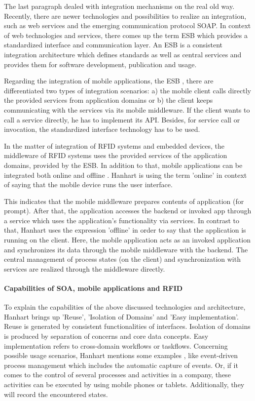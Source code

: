 The last paragraph dealed with integration mechanisms on the real old way. Recently, there are newer technologies and possibilities to realize an integration, such as web services and the emerging communication protocol \ac{SOAP}. In context of web technologies and services, there comes up the term \ac{ESB} \cite[p.141 ff.]{mobile} which provides a standardized interface and communication layer. An ESB is a consistent integration architecture which defines standards as well as central services and provides them for software development, publication and usage. 

Regarding the integration of mobile applications, the ESB \cite[p.143]{mobile}, there are differentiated two types of integration scenarios: a) the mobile client calls directly the provided services from application domains or b) the client keeps communicating with the services via its mobile middleware. If the client wants to call a service directly, he has to implement its \ac{API}. Besides, for service call or invocation, the standardized interface technology has to be used.

In the matter of integration of RFID systems and embedded devices, the middleware of RFID systems uses the provided services of the application domains, provided by the ESB. In addition to that, mobile applications can be integrated both online and offline \cite[p.146 ff.]{mobile}. Hanhart is using the term 'online' in context of saying that the mobile device runs the user interface. 

This indicates that the mobile middleware prepares contents of application (for prompt). After that, the application accesses the backend or invoked app through a service which uses the application's functionality via services. In contrast to that, Hanhart uses the expression 'offline' in order to say that the application is running on the client. Here, the mobile application acts as an invoked application and synchronizes its data through the mobile middleware with the backend. The central management of process states (on the client) and synchronization with services are realized through the middleware directly.

\paragraph{Capabilities of SOA, mobile applications and RFID}

To explain the capabilities of the above discussed technologies and architecture, Hanhart brings up 'Reuse', 'Isolation of Domains' and 'Easy implementation'. Reuse is generated by consistent functionalities of interfaces. Isolation of domains is produced by separation of concerns and core data concepts. Easy implementation refers to cross-domain workflows or taskflows. Concerning possible usage scenarios, Hanhart mentions some examples \cite[p.207 ff.]{mobile}, like event-driven process management which includes the automatic capture of events. Or, if it comes to the control of several processes and activities in a company, these activities can be executed by using mobile phones or tablets. Additionally, they will record the encountered states.

